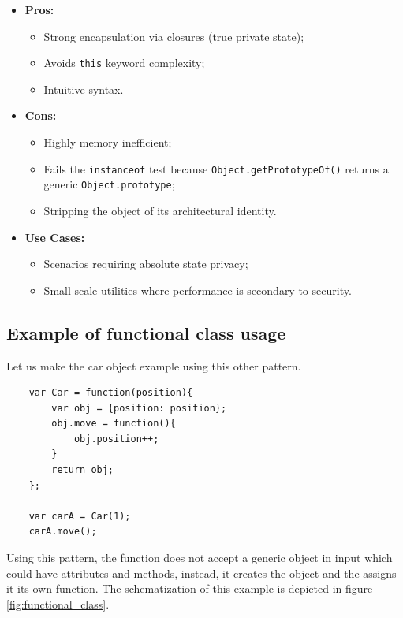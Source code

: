 \documentclass{scrbook}
\begin{document}
\begin{itemize}
    \item
        \textbf{Pros:}   
        \begin{itemize}
            \item Strong encapsulation via closures (true private state);
            \item Avoids \texttt{this} keyword complexity;
            \item Intuitive syntax.
        \end{itemize}
    
    \item
        \textbf{Cons:}   
        \begin{itemize}
            \item Highly memory inefficient;
            \item Fails the \texttt{instanceof} test because \texttt{Object.getPrototypeOf()} returns a generic \texttt{Object.prototype};
            \item Stripping the object of its architectural identity.
        \end{itemize}
    
    \item
        \textbf{Use Cases:}
        \begin{itemize}
            \item Scenarios requiring absolute state privacy;
            \item Small-scale utilities where performance is secondary to security.
        \end{itemize}
\end{itemize}

\subsection{Example of functional class usage}

Let us make the car object example using this other pattern.

\begin{lstlisting}
    var Car = function(position){
        var obj = {position: position};
        obj.move = function(){
            obj.position++;
        }
        return obj;
    };
    
    var carA = Car(1);
    carA.move();
\end{lstlisting}

Using this pattern, the function does not accept a generic object in input which could have attributes and methods, instead, it creates the object and the assigns it its own function. The schematization of this example is depicted in figure \ref{fig:functional_class}.\\
\end{document}

